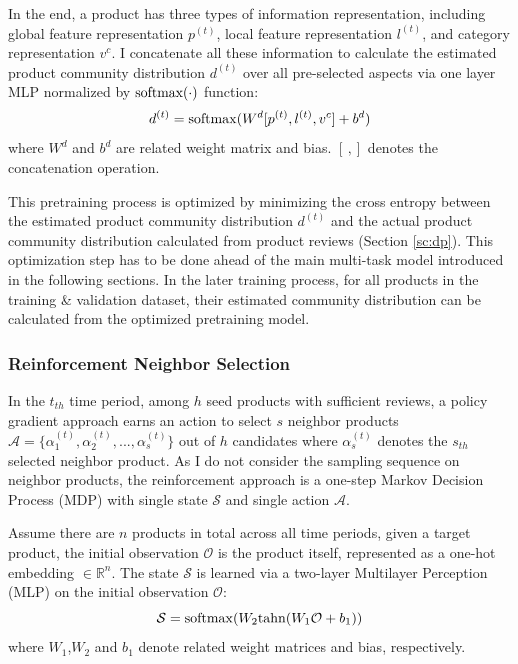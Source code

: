 In the end, a product has three types of information representation, including global feature representation $p^{(t)}$, local feature representation $l^{(t)}$, and category representation $v^{c}$. I concatenate all these information to calculate the estimated product community distribution $d^{(t)}$ over all pre-selected aspects via one layer MLP normalized by $\rm softmax(\cdot)$ function:
\begin{equation}
d^{(t)} = {\rm softmax}(W^{d}[p^{(t)},l^{(t)},v^{c}]+b^{d})
\end{equation}
where $W^{d}$ and $b^{d}$ are related weight matrix and bias. $[\,, ]$ denotes the concatenation operation. 

This pretraining process is optimized by minimizing the cross entropy between the estimated product community distribution $d^{(t)}$ and the actual product community distribution calculated from product reviews (Section \ref{sc:dp}). This optimization step has to be done ahead of the main multi-task model introduced in the following sections. In the later training process, for all products in the training \& validation dataset, their estimated community distribution can be calculated from the optimized pretraining model.

\subsubsection{Reinforcement Neighbor Selection} \label{sc:rns}

In the $t_{th}$ time period, among $h$ seed products with sufficient reviews, a policy gradient approach earns an action to select $s$ neighbor products $\mathcal{A} = \{\alpha_{1}^{(t)},\alpha_{2}^{(t)},...,\alpha_{s}^{(t)}\}$ out of $h$ candidates where $\alpha_{s}^{(t)}$ denotes the $s_{th}$ selected neighbor product. As I do not consider the sampling sequence on neighbor products, the reinforcement approach is a one-step Markov Decision Process (MDP) with single state $\mathcal{S}$ and single action $\mathcal{A}$. 

Assume there are $n$ products in total across all time periods, given a target product, the initial observation $\mathcal{O}$ is the product itself, represented as a one-hot embedding $\in \mathbb{R}^{n}$. The state $\mathcal{S}$ is learned via a two-layer Multilayer Perception (MLP) on the initial observation $\mathcal{O}$:
\begin{equation}
\label{eq:state}
\mathcal{S} = {\rm softmax} (W_{2}{\rm tahn}(W_{1}\mathcal{O} + b_{1}))
\end{equation} 
where $W_1$,$W_2$ and $b_1$ denote related weight matrices and bias, respectively. 

